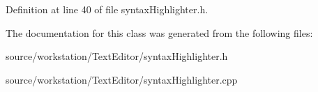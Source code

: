 Definition at line 40 of file syntax\-Highlighter.\-h.



The documentation for this class was generated from the following files\-:\begin{DoxyCompactItemize}
\item 
source/workstation/\-Text\-Editor/syntax\-Highlighter.\-h\item 
source/workstation/\-Text\-Editor/syntax\-Highlighter.\-cpp\end{DoxyCompactItemize}
